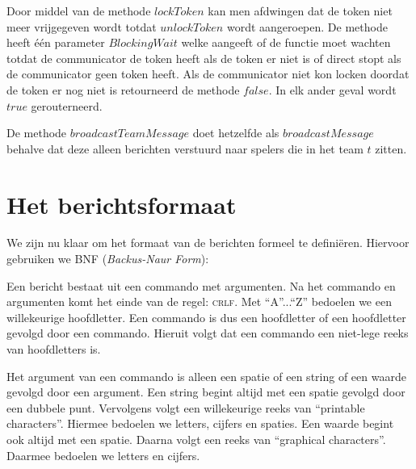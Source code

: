 \documentclass[a4paper,11pt]{article}
\begin{document}
Door middel van de methode $lockToken$ kan men afdwingen dat de token niet meer vrijgegeven wordt totdat $unlockToken$ wordt aangeroepen. De methode heeft \'e\'en parameter $BlockingWait$ welke aangeeft of de functie moet wachten totdat de communicator de token heeft als de token er niet is of direct stopt als de communicator geen token heeft. Als de communicator niet kon locken doordat de token er nog niet is retourneerd de methode $false$. In elk ander geval wordt $true$ gerouterneerd.

De methode $broadcastTeamMessage$ doet hetzelfde als $broadcastMessage$ behalve dat deze alleen berichten verstuurd naar spelers die in het team $t$ zitten.

    \section{Het berichtsformaat}
    \label{sec:protocol}
    We zijn nu klaar om het formaat van de berichten formeel te defini\"eren. Hiervoor gebruiken we BNF (\emph{Backus-Naur Form}):
	
	\begin{center} \end{center}

    Een bericht bestaat uit een commando met argumenten. Na het commando en argumenten komt het einde van de regel: \textsc{crlf}. Met ``A''...``Z'' bedoelen we een willekeurige hoofdletter. Een commando is dus een hoofdletter of een hoofdletter gevolgd door een commando. Hieruit volgt dat een commando een niet-lege reeks van hoofdletters is.

    Het argument van een commando is alleen een spatie of een string of een waarde gevolgd door een argument. Een string begint altijd met een spatie gevolgd door een dubbele punt. Vervolgens volgt een willekeurige reeks van ``printable characters''. Hiermee bedoelen we letters, cijfers en spaties. Een waarde begint ook altijd met een spatie. Daarna volgt een reeks van ``graphical characters''. Daarmee bedoelen we letters en cijfers.
\end{document}
